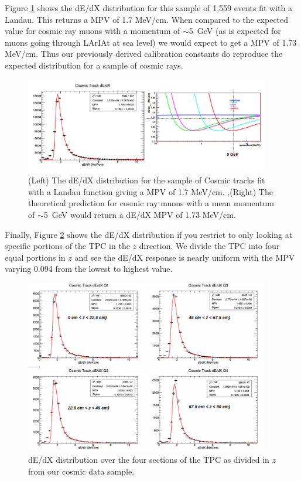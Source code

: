 Figure \ref{fig:CosmicdEdX} shows the dE/dX distribution for this sample of 1,559 events fit with a Landau. This returns a MPV of 1.7 MeV/cm. When compared to the expected value for cosmic ray muons with a momentum of $\sim$5~GeV (as is expected for muons going through LArIAt at sea level) we would expect to get a MPV of 1.73 MeV/cm. Thus our previously derived calibration constants do reproduce the expected distribution for a sample of cosmic rays.

\begin{figure}[htb]
\centering
\includegraphics[width=0.95\textwidth]{images/CosmicdEdX.png}
\caption{(Left) The dE/dX distribution for the sample of Cosmic tracks fit with a Landau function giving a MPV of 1.7 MeV/cm. ,(Right) The theoretical prediction for cosmic ray muons with a mean momentum of $\sim$5~GeV would return a dE/dX MPV of 1.73 MeV/cm.}
\label{fig:CosmicdEdX}
\end{figure}

Finally, Figure \ref{fig:CosmicdEdXSections} shows the dE/dX distribution if you restrict to only looking at specific portions of the TPC in the $z$ direction. We divide the TPC into four equal portions in $z$ and see the dE/dX response is nearly uniform with the MPV varying 0.094 from the lowest to highest value. 

\begin{figure}[htb]
\centering
\includegraphics[width=0.95\textwidth]{images/CosmicFourSections.png}
\caption{dE/dX distribution over the four sections of the TPC as divided in $z$ from our cosmic data sample.}
\label{fig:CosmicdEdXSections}
\end{figure}



